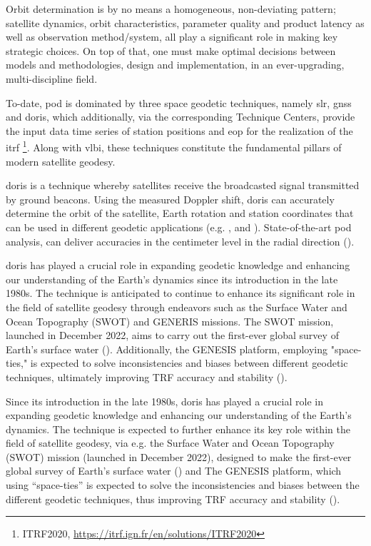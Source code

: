 Orbit determination is by no means a homogeneous, non-deviating pattern; satellite 
dynamics, orbit characteristics, parameter quality and product latency as well 
as observation method/system, all play a significant role in making key strategic 
choices. On top of that, one must make optimal decisions between models and
methodologies, design and implementation, in an ever-upgrading, multi-discipline 
field.

To-date, \gls{pod} is dominated by three space geodetic techniques, namely \gls{slr}, \gls{gnss} and
\gls{doris}, which additionally, via the corresponding Technique Centers, provide the input
data time series of station positions and \gls{eop} for the realization of the \gls{itrf}
\footnote{ITRF2020, \url{https://itrf.ign.fr/en/solutions/ITRF2020}}. Along with \gls{vlbi}, these
techniques constitute the fundamental pillars of modern satellite geodesy.

\gls{doris} is a technique whereby satellites receive the broadcasted signal 
transmitted by ground beacons. Using the measured Doppler shift, \gls{doris} 
can accurately determine the orbit of the satellite, Earth rotation and 
station coordinates that can be used in different geodetic applications (e.g. \cite{Lemoine2016}, \cite{Gambis2006} and \cite{Kur2022}).
State-of-the-art \gls{pod} analysis, can deliver accuracies in the 
centimeter level in the radial direction (\cite{Rudenko2023}).

\gls{doris} has played a crucial role in expanding geodetic knowledge and enhancing
our understanding of the Earth's dynamics since its introduction in the late 1980s.
The technique is anticipated to continue to enhance its significant role in the field
of satellite geodesy through endeavors such as the Surface Water and Ocean Topography
(SWOT) and GENERIS missions. The SWOT mission, launched in December 2022, aims to carry
out the
first-ever global survey of Earth's surface water (\cite{Biancamaria2016}). Additionally,
the GENESIS platform, employing "space-ties," is expected to solve inconsistencies and
biases between different geodetic techniques, ultimately improving TRF accuracy and
stability (\cite{Delva2023}).

\iffalse
Since its introduction in the late 1980s, \gls{doris} has played a crucial role 
in expanding geodetic knowledge and enhancing our understanding of the Earth’s 
dynamics. The technique is expected to further enhance its key role within the 
field of satellite geodesy, via e.g. the Surface Water and Ocean Topography (SWOT) 
mission (launched in December 2022), designed to make the first-ever global 
survey of Earth's surface water (\cite{Biancamaria2016}) and The GENESIS platform, 
which using ``space-ties'' is expected to solve the inconsistencies and biases 
between the different geodetic techniques, thus improving TRF accuracy and stability 
(\cite{Delva2023}).

